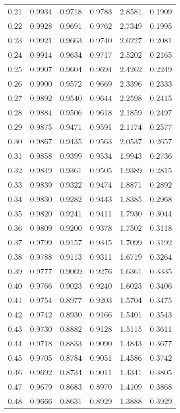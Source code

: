 \documentclass{article}
\begin{document}
\begin{longtable}{cccccc}
0.21 & 0.9934 & 0.9718 & 0.9783 & 2.8581 & 0.1909 \\
0.22 & 0.9928 & 0.9691 & 0.9762 & 2.7349 & 0.1995 \\
0.23 & 0.9921 & 0.9663 & 0.9740 & 2.6227 & 0.2081 \\
0.24 & 0.9914 & 0.9634 & 0.9717 & 2.5202 & 0.2165 \\
0.25 & 0.9907 & 0.9604 & 0.9694 & 2.4262 & 0.2249 \\
0.26 & 0.9900 & 0.9572 & 0.9669 & 2.3396 & 0.2333 \\
0.27 & 0.9892 & 0.9540 & 0.9644 & 2.2598 & 0.2415 \\
0.28 & 0.9884 & 0.9506 & 0.9618 & 2.1859 & 0.2497 \\
0.29 & 0.9875 & 0.9471 & 0.9591 & 2.1174 & 0.2577 \\
0.30 & 0.9867 & 0.9435 & 0.9563 & 2.0537 & 0.2657 \\
0.31 & 0.9858 & 0.9399 & 0.9534 & 1.9943 & 0.2736 \\
0.32 & 0.9849 & 0.9361 & 0.9505 & 1.9389 & 0.2815 \\
0.33 & 0.9839 & 0.9322 & 0.9474 & 1.8871 & 0.2892 \\
0.34 & 0.9830 & 0.9282 & 0.9443 & 1.8385 & 0.2968 \\
0.35 & 0.9820 & 0.9241 & 0.9411 & 1.7930 & 0.3044 \\
0.36 & 0.9809 & 0.9200 & 0.9378 & 1.7502 & 0.3118 \\
0.37 & 0.9799 & 0.9157 & 0.9345 & 1.7099 & 0.3192 \\
0.38 & 0.9788 & 0.9113 & 0.9311 & 1.6719 & 0.3264 \\
0.39 & 0.9777 & 0.9069 & 0.9276 & 1.6361 & 0.3335 \\
0.40 & 0.9766 & 0.9023 & 0.9240 & 1.6023 & 0.3406 \\
0.41 & 0.9754 & 0.8977 & 0.9203 & 1.5704 & 0.3475 \\
0.42 & 0.9742 & 0.8930 & 0.9166 & 1.5401 & 0.3543 \\
0.43 & 0.9730 & 0.8882 & 0.9128 & 1.5115 & 0.3611 \\
0.44 & 0.9718 & 0.8833 & 0.9090 & 1.4843 & 0.3677 \\
0.45 & 0.9705 & 0.8784 & 0.9051 & 1.4586 & 0.3742 \\
0.46 & 0.9692 & 0.8734 & 0.9011 & 1.4341 & 0.3805 \\
0.47 & 0.9679 & 0.8683 & 0.8970 & 1.4109 & 0.3868 \\
0.48 & 0.9666 & 0.8631 & 0.8929 & 1.3888 & 0.3929 \\

\end{longtable}
\end{document}
